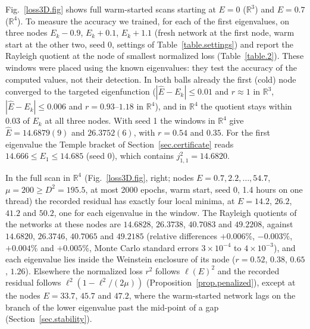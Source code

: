 \documentclass[10pt]{amsart}
\newenvironment{revblock}{\color{blue}}{}
\theoremstyle{definition}
\theoremstyle{remark}
\theoremstyle{plain}
\newcommand{\R}{\mathbb{R}}
\begin{document}
\begin{revblock}
Fig.~\ref{loss3D.fig} shows full warm-started scans starting at $E=0$ ($\R^3$) and $E=0.7$ ($\R^4$). To measure the accuracy we trained, for
each of the first eigenvalues, on three nodes $E_k-0.9$, $E_k+0.1$, $E_k+1.1$ (fresh network at the
first node, warm start at the other two, seed 0, settings of Table~\ref{table.settings}) and report
the Rayleigh quotient at the node of smallest normalized loss (Table~\ref{table.2}). These windows
were placed using the known eigenvalues: they test the accuracy of the computed values, not their
detection. In both balls already the first (cold) node converged to the targeted eigenfunction
($|\hat E-E_k|\le0.01$ and $r\approx1$ in $\R^3$, $|\hat E-E_k|\le0.006$ and $r=0.93$--$1.18$ in $\R^4$),
and in $\R^4$ the quotient stays within $0.03$ of $E_k$ at all three nodes. With seed 1 the windows
in $\R^4$ give $\hat E=14.6879(9)$ and $26.3752(6)$, with $r=0.54$ and $0.35$. For the first eigenvalue
the Temple bracket of Section~\ref{sec.certificate} reads $14.666\le E_1\le14.685$ (seed 0), which
contains $j_{1,1}^2=14.6820$.

In the full scan in $\R^4$ (Fig.~\ref{loss3D.fig}, right; nodes $E=0.7,2.2,\dots,54.7$, $\mu=200\ge
D^2=195.5$, at most 2000 epochs, warm start, seed 0, 1.4 hours on one thread) the recorded residual
has exactly four local minima, at $E=14.2$, $26.2$, $41.2$ and $50.2$, one for each eigenvalue in the
window. The Rayleigh quotients of the networks at these nodes are $14.6828$, $26.3738$, $40.7083$ and
$49.2208$, against $14.6820$, $26.3746$, $40.7065$ and $49.2185$ (relative differences $+0.006\%$,
$-0.003\%$, $+0.004\%$ and $+0.005\%$, Monte Carlo standard errors $3\times10^{-4}$ to $4\times10^{-3}$),
and each eigenvalue lies inside the Weinstein enclosure of its node ($r=0.52$, $0.38$, $0.65$, $1.26$).
Elsewhere the normalized loss $r^2$ follows $\ell(E)^2$ and the recorded residual follows
$\ell^2(1-\ell^2/(2\mu))$ (Proposition~\ref{prop.penalized}), except at the nodes $E=33.7$, $45.7$ and $47.2$,
where the warm-started network lags on the branch of the lower eigenvalue past the mid-point of a
gap (Section~\ref{sec.stability}).
\end{revblock}
\end{document}
